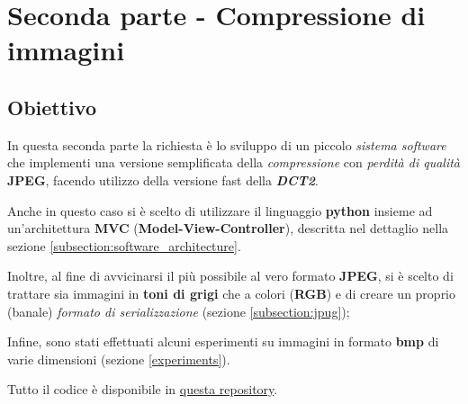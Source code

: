 \section{Seconda parte - Compressione di immagini}
\subsection{Obiettivo}
    In questa seconda parte la richiesta è lo sviluppo di un piccolo \textit{sistema software} che implementi una versione semplificata della \textit{compressione} con \textit{perdità di qualità} \textbf{JPEG}, facendo utilizzo della versione fast della \textit{\textbf{DCT2}}.
    
    Anche in questo caso si è scelto di utilizzare il linguaggio \textbf{python} insieme ad un'architettura \textbf{MVC} (\textbf{Model-View-Controller}), descritta nel dettaglio nella sezione \ref{subsection:software_architecture}. 

    Inoltre, al fine di avvicinarsi il più possibile al vero formato \textbf{JPEG}, si è scelto di trattare sia immagini in \textbf{toni di grigi} che a colori (\textbf{RGB}) e di creare un proprio (banale) \textit{formato di serializzazione} (sezione \ref{subsection:jpug}); 
    
    Infine, sono stati effettuati alcuni esperimenti su immagini in formato \textbf{bmp} di varie dimensioni (sezione \ref{experiments}).

    Tutto il codice è disponibile in \href{https://github.com/iFoxz17/Jpug/tree/main/jpug}{questa repository}.

